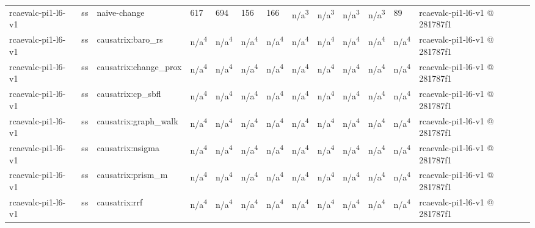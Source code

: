 \begin{table}[t]
\begin{tabular}{lllllllllllll}
rcaevalc-pi1-l6-v1 & ss & naive-change & 617 & 694 & 156 & 166 & n/a\textsuperscript{3} & n/a\textsuperscript{3} & n/a\textsuperscript{3} & n/a\textsuperscript{3} & 89 & rcaevalc-pi1-l6-v1 @ 281787f1 \\
rcaevalc-pi1-l6-v1 & ss & causatrix:baro\_rs & n/a\textsuperscript{4} & n/a\textsuperscript{4} & n/a\textsuperscript{4} & n/a\textsuperscript{4} & n/a\textsuperscript{4} & n/a\textsuperscript{4} & n/a\textsuperscript{4} & n/a\textsuperscript{4} & n/a\textsuperscript{4} & rcaevalc-pi1-l6-v1 @ 281787f1 \\
rcaevalc-pi1-l6-v1 & ss & causatrix:change\_prox & n/a\textsuperscript{4} & n/a\textsuperscript{4} & n/a\textsuperscript{4} & n/a\textsuperscript{4} & n/a\textsuperscript{4} & n/a\textsuperscript{4} & n/a\textsuperscript{4} & n/a\textsuperscript{4} & n/a\textsuperscript{4} & rcaevalc-pi1-l6-v1 @ 281787f1 \\
rcaevalc-pi1-l6-v1 & ss & causatrix:cp\_sbfl & n/a\textsuperscript{4} & n/a\textsuperscript{4} & n/a\textsuperscript{4} & n/a\textsuperscript{4} & n/a\textsuperscript{4} & n/a\textsuperscript{4} & n/a\textsuperscript{4} & n/a\textsuperscript{4} & n/a\textsuperscript{4} & rcaevalc-pi1-l6-v1 @ 281787f1 \\
rcaevalc-pi1-l6-v1 & ss & causatrix:graph\_walk & n/a\textsuperscript{4} & n/a\textsuperscript{4} & n/a\textsuperscript{4} & n/a\textsuperscript{4} & n/a\textsuperscript{4} & n/a\textsuperscript{4} & n/a\textsuperscript{4} & n/a\textsuperscript{4} & n/a\textsuperscript{4} & rcaevalc-pi1-l6-v1 @ 281787f1 \\
rcaevalc-pi1-l6-v1 & ss & causatrix:nsigma & n/a\textsuperscript{4} & n/a\textsuperscript{4} & n/a\textsuperscript{4} & n/a\textsuperscript{4} & n/a\textsuperscript{4} & n/a\textsuperscript{4} & n/a\textsuperscript{4} & n/a\textsuperscript{4} & n/a\textsuperscript{4} & rcaevalc-pi1-l6-v1 @ 281787f1 \\
rcaevalc-pi1-l6-v1 & ss & causatrix:prism\_m & n/a\textsuperscript{4} & n/a\textsuperscript{4} & n/a\textsuperscript{4} & n/a\textsuperscript{4} & n/a\textsuperscript{4} & n/a\textsuperscript{4} & n/a\textsuperscript{4} & n/a\textsuperscript{4} & n/a\textsuperscript{4} & rcaevalc-pi1-l6-v1 @ 281787f1 \\
rcaevalc-pi1-l6-v1 & ss & causatrix:rrf & n/a\textsuperscript{4} & n/a\textsuperscript{4} & n/a\textsuperscript{4} & n/a\textsuperscript{4} & n/a\textsuperscript{4} & n/a\textsuperscript{4} & n/a\textsuperscript{4} & n/a\textsuperscript{4} & n/a\textsuperscript{4} & rcaevalc-pi1-l6-v1 @ 281787f1 \\

\end{tabular}
\end{table}

